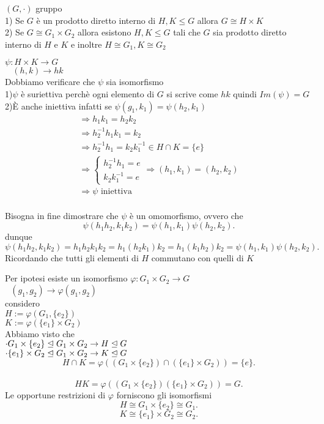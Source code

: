 \documentclass[12px]{article}
\begin{document}
{	  \begin{teo}
	  	$(G,\cdot)$ gruppo\\
		1) Se $G$ è un prodotto diretto interno di $H,K\leq G$ allora  $G\cong H\times K$\\
		2) Se  $G\cong G_1\times G_2$ allora esistono $H,K\leq G$ tali che $G$ sia prodotto diretto interno di $H$ e $K$ e inoltre $H\cong G_1, K\cong G_2$
	  \end{teo}
	  \begin{dimo}[1]
	  	$\psi: H\times K \rightarrow G$\\
		$\ \ \ \ (h,k) \rightarrow hk$\\
		Dobbiamo verificare che $\psi$ sia isomorfismo\\
		1)$\psi$ è suriettiva perchè ogni elemento di $G$ si scrive come $hk$ quindi $Im(\psi) = G$\\
		2)È anche iniettiva infatti se  $\psi(g_1,k_1) = \psi(h_2,k_1)$
		\begin{gather*}
			\Rightarrow h_1k_1 = h_2k_2\\
			\Rightarrow h_2^{-1}h_1k_1 = k_2\\
			\Rightarrow h_2^{-1}h_1 = k_2k_1^{-1}\in H\cap K = \{e\}\\
			\Rightarrow \begin{cases}
				h_2^{-1}h_1 = e\\
				k_2k_1^{-1} = e
			\end{cases} \Rightarrow (h_1,k_1) = (h_2,k_2)\\
			\Rightarrow \psi \text{ iniettiva}
		\end{gather*}\\
		Bisogna in fine dimostrare che $\psi$ è un omomorfismo, ovvero che\\
		\[
		\psi(h_1h_2,k_1k_2) = \psi(h_1,k_1)\psi(h_2,k_2)
		.\] 
		dunque
		\[
		\psi(h_1h_2,k_1k_2) = h_1h_2k_1k_2 = h_1(h_2k_1)k_2 = h_1(k_1h_2)k_2 = \psi(h_1,k_1)\psi(h_2,k_2)
		.\] 
		Ricordando che tutti gli elementi di $H$ commutano con quelli di $K$
	  \end{dimo}
	  \begin{dimo}[2]
	  	Per ipotesi esiste un isomorfismo
		$ \varphi: G_1\times G_2 \rightarrow G$\\
		$\ \ \ (g_1,g_2) \rightarrow \varphi(g_1,g_2)$\\
		considero\\
		$H:= \varphi(G_1,\{e_2\})$\\
		$K:= \varphi(\{e_1\}\times G_2)$ \\
		Abbiamo visto che\\
		$\cdot G_1\times \{e_2\}\trianglelefteq G_1\times G_2 \rightarrow H\trianglelefteq G$\\
		$\cdot \{e_1\}\times G_2\trianglelefteq G_1\times G_2 \rightarrow K\trianglelefteq G$ \\
		\[
			H\cap K = \varphi((G_1\times\{e_2\})\cap(\{e_1\}\times G_2)) = \{e\}
		.\] \\
		\[
			HK = \varphi((G_1\times \{e_2\})(\{e_1\}\times G_2)) = G
	.\]
	Le opportune restrizioni di $ \varphi$ forniscono gli isomorfismi
	\[
		H\cong G_1\times \{e_2\}\cong G_1
	.\] 
	\[
		K\cong \{e_1\}\times G_2\cong G_2
	.\] 


\end{dimo}}
\end{document}
